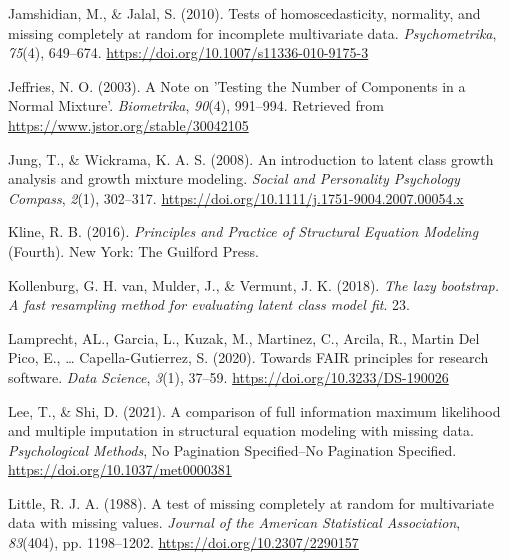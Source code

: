 \documentclass[
  ,man,floatsintext]{apa6}
\newlength{\cslhangindent}
\newlength{\cslentryspacingunit} %
\newenvironment{CSLReferences}[2] %
 {%
  \setlength{\parindent}{0pt}
  \ifodd #1
  \let\oldpar\par
  \def\par{\hangindent=\cslhangindent\oldpar}
  \fi
  \setlength{\parskip}{#2\cslentryspacingunit}
 }%
 {}
\begin{document}
\begin{CSLReferences}{1}{0}
\leavevmode{}%
Jamshidian, M., \& Jalal, S. (2010). Tests of homoscedasticity, normality, and missing completely at random for incomplete multivariate data. \emph{Psychometrika}, \emph{75}(4), 649--674. \url{https://doi.org/10.1007/s11336-010-9175-3}

\leavevmode{}%
Jeffries, N. O. (2003). A {Note} on '{Testing} the {Number} of {Components} in a {Normal Mixture}'. \emph{Biometrika}, \emph{90}(4), 991--994. Retrieved from \url{https://www.jstor.org/stable/30042105}

\leavevmode{}%
Jung, T., \& Wickrama, K. A. S. (2008). An introduction to latent class growth analysis and growth mixture modeling. \emph{Social and Personality Psychology Compass}, \emph{2}(1), 302--317. \url{https://doi.org/10.1111/j.1751-9004.2007.00054.x}

\leavevmode{}%
Kline, R. B. (2016). \emph{Principles and {Practice} of {Structural Equation Modeling}} (Fourth). {New York}: {The Guilford Press}.

\leavevmode{}%
Kollenburg, G. H. van, Mulder, J., \& Vermunt, J. K. (2018). \emph{The lazy bootstrap. A fast resampling method for evaluating latent class model fit}. 23.

\leavevmode{}%
Lamprecht, AL., Garcia, L., Kuzak, M., Martinez, C., Arcila, R., Martin Del Pico, E., \ldots{} Capella-Gutierrez, S. (2020). Towards {FAIR} principles for research software. \emph{Data Science}, \emph{3}(1), 37--59. \url{https://doi.org/10.3233/DS-190026}

\leavevmode{}%
Lee, T., \& Shi, D. (2021). A comparison of full information maximum likelihood and multiple imputation in structural equation modeling with missing data. \emph{Psychological Methods}, No Pagination Specified--No Pagination Specified. \url{https://doi.org/10.1037/met0000381}

\leavevmode{}%
Little, R. J. A. (1988). A test of missing completely at random for multivariate data with missing values. \emph{Journal of the American Statistical Association}, \emph{83}(404), pp. 1198--1202. \url{https://doi.org/10.2307/2290157}


\end{CSLReferences}
\end{document}
